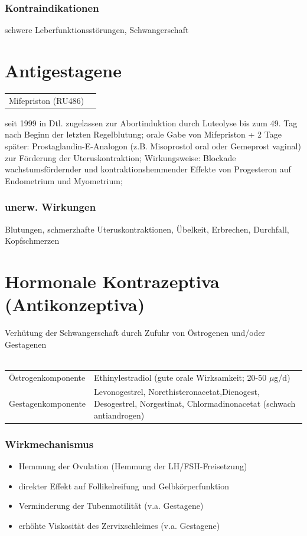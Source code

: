 \documentclass[10pt,a4paper]{report}
\begin{document}
\subsubsection{Kontraindikationen} %
\label{par:kontraindikationen}
schwere Leberfunktionsstörungen, Schwangerschaft\\
\section{Antigestagene} %
\label{sec:antigestagene}
\begin{tabularx}{\textwidth}{XX}
Mifepriston (RU486)
\end{tabularx}
seit 1999 in Dtl. zugelassen zur Abortinduktion durch Luteolyse bis zum 49. Tag nach Beginn der letzten Regelblutung; orale Gabe von Mifepriston + 2 Tage später: Prostaglandin-E-Analogon (z.B. Misoprostol oral oder Gemeprost vaginal) zur Förderung der Uteruskontraktion; Wirkungsweise: Blockade wachstumsfördernder und kontraktionshemmender Effekte von Progesteron auf Endometrium und Myometrium;
\subsubsection{unerw. Wirkungen} Blutungen, schmerzhafte Uteruskontraktionen, Übelkeit, Erbrechen, Durchfall, Kopfschmerzen
\section{Hormonale Kontrazeptiva (Antikonzeptiva)} %
\label{sec:hormonale_kontrazeptiva_}
Verhütung der Schwangerschaft durch Zufuhr von Östrogenen und/oder Gestagenen \\ \\
\begin{tabularx}{\textwidth}{lX}
Östrogenkomponente&Ethinylestradiol (gute orale Wirksamkeit; 20-50 $\mu$g/d)\\
Gestagenkomponente&Levonogestrel, Norethisteronacetat,Dienogest, Desogestrel,	Norgestinat,	Chlormadinonacetat (schwach antiandrogen)\\
\end{tabularx}
\subsubsection{Wirkmechanismus} %
\label{par:wirkmechanismus}
\begin{itemize}
	\item Hemmung der Ovulation (Hemmung der LH/FSH-Freisetzung)
	\item direkter Effekt auf Follikelreifung und Gelbkörperfunktion
	\item Verminderung der Tubenmotilität (v.a. Gestagene)
	\item erhöhte Viskosität des Zervixschleimes (v.a. Gestagene)
\end{itemize}
\end{document}
